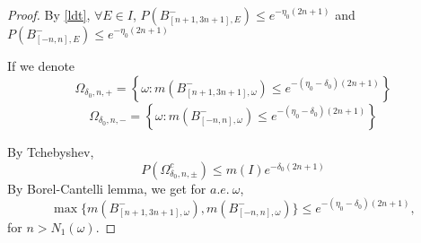 \begin{proof}
  By \eqref{ldt}, $\forall E\in I$, $P(B_{[n+1,3n+1],E}^-)\leq e^{-\eta_0(2n+1)}$ and $P(B_{[-n,n],E}^-)\leq e^{-\eta_0(2n+1)}$

  If we denote
    \[
      \Omega_{\delta_0,n,+}=\left\{\omega:m(B_{[n+1,3n+1],\omega}^-)\leq e^{-(\eta_0-\delta_0)(2n+1)}\right\}
    \]
    \[
    \Omega_{\delta_0,n,-}=\left\{\omega:m(B_{[-n,n],\omega}^-)\leq e^{-(\eta_0-\delta_0)(2n+1)}\right\}
    \]

  By Tchebyshev,
  \[
      P(\Omega_{\delta_0,n,\pm}^c)
      \leq m(I)e^{-\delta_0(2n+1)}
  \]
By Borel-Cantelli lemma, we get for $a.e.~\omega$,
\[
\max\{m(B_{[n+1,3n+1],\omega}^-),m(B_{[-n,n],\omega}^-)\}\leq e^{-(\eta_0-\delta_0)(2n+1)},
\]
for $n>N_1(\omega)$.
\end{proof}


